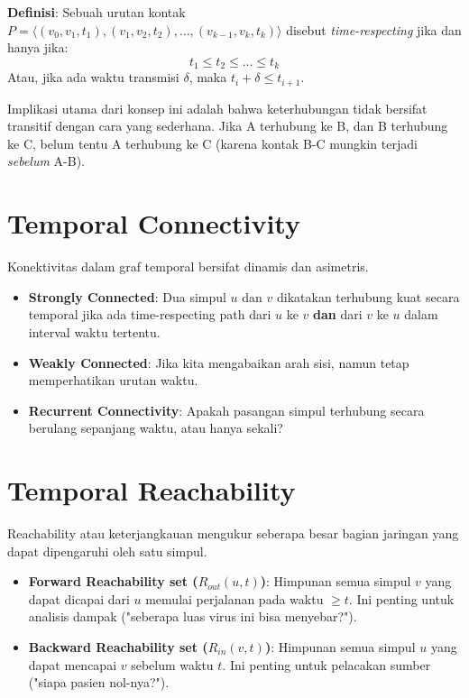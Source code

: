 \documentclass[12pt,a4paper]{book}
\begin{document}
\textbf{Definisi}: Sebuah urutan kontak $P = \langle (v_0, v_1, t_1), (v_1, v_2, t_2), \dots, (v_{k-1}, v_k, t_k) \rangle$ disebut \textit{time-respecting} jika dan hanya jika:
$$ t_1 \le t_2 \le \dots \le t_k $$
Atau, jika ada waktu transmisi $\delta$, maka $t_{i} + \delta \le t_{i+1}$.

Implikasi utama dari konsep ini adalah bahwa keterhubungan tidak bersifat transitif dengan cara yang sederhana. Jika A terhubung ke B, dan B terhubung ke C, belum tentu A terhubung ke C (karena kontak B-C mungkin terjadi \textit{sebelum} A-B).

\section{Temporal Connectivity}
Konektivitas dalam graf temporal bersifat dinamis dan asimetris.
\begin{itemize}
    \item \textbf{Strongly Connected}: Dua simpul $u$ dan $v$ dikatakan terhubung kuat secara temporal jika ada time-respecting path dari $u$ ke $v$ \textbf{dan} dari $v$ ke $u$ dalam interval waktu tertentu.
    \item \textbf{Weakly Connected}: Jika kita mengabaikan arah sisi, namun tetap memperhatikan urutan waktu.
    \item \textbf{Recurrent Connectivity}: Apakah pasangan simpul terhubung secara berulang sepanjang waktu, atau hanya sekali?
\end{itemize}

\section{Temporal Reachability}
Reachability atau keterjangkauan mengukur seberapa besar bagian jaringan yang dapat dipengaruhi oleh satu simpul.
\begin{itemize}
    \item \textbf{Forward Reachability set ($R_{out}(u, t)$)}: Himpunan semua simpul $v$ yang dapat dicapai dari $u$ memulai perjalanan pada waktu $\ge t$. Ini penting untuk analisis dampak ("seberapa luas virus ini bisa menyebar?").
    \item \textbf{Backward Reachability set ($R_{in}(v, t)$)}: Himpunan semua simpul $u$ yang dapat mencapai $v$ sebelum waktu $t$. Ini penting untuk pelacakan sumber ("siapa pasien nol-nya?").
\end{itemize}
\end{document}
